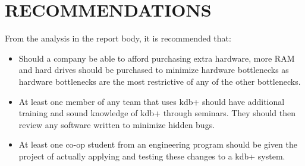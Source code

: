 \section{RECOMMENDATIONS} %
\label{sec:recommendations}
From the analysis in the report body, it is recommended that:\\

\begin{itemize}
	\item Should a company be able to afford purchasing extra hardware, more RAM and hard drives should be purchased to minimize hardware bottlenecks as hardware bottlenecks are the most restrictive of any of the other bottlenecks.
	
	\item At least one member of any team that uses kdb+ should have additional training and sound knowledge of kdb+ through seminars.  They should then review any software written to minimize hidden bugs.
	
	\item At least one co-op student from an engineering program should be given the project of actually applying and testing these changes to a kdb+ system.
\end{itemize}

